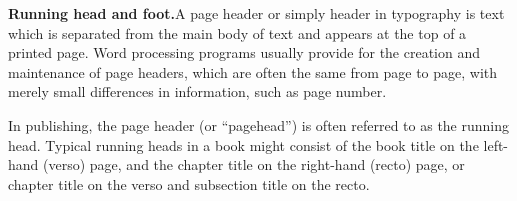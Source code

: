 \begin{multicols}{2}
\textbf{Running head and foot.}\quad A page header or simply header in typography is text which is separated from the main body of text and appears at the top of a printed page. Word processing programs usually provide for the creation and maintenance of page headers, which are often the same from page to page, with merely small differences in information, such as page number.

In publishing, the page header (or ``pagehead'') is often referred to as the running head. Typical running heads in a book might consist of the book title on the left-hand (verso) page, and the chapter title on the right-hand (recto) page, or chapter title on the verso and subsection title on the recto.
\end{multicols}



\begin{teX}
\if@twoside
  \def\ps@headings{%
      \let\@oddfoot\@empty\let\@evenfoot\@empty
      \def\@evenhead{\thepage\hfil\slshape\leftmark}%
      \def\@oddhead{{\slshape\rightmark}\hfil\thepage}%
      \let\@mkboth\markboth
  \def\chaptermark##1{%
      \markboth {\MakeUppercase{%
        \ifnum \c@secnumdepth >\m@ne
          \if@mainmatter
            \@chapapp\ \thechapter. \ %
          \fi
        \fi
        ##1}}{}}%
    \def\sectionmark##1{%
      \markright {\MakeUppercase{%
        \ifnum \c@secnumdepth >\z@
          \thesection. \ %
        \fi
        ##1}}}}
\else
  \def\ps@headings{%
    \let\@oddfoot\@empty
    \def\@oddhead{{\slshape\rightmark}\hfil\thepage}%
    \let\@mkboth\markboth
    \def\chaptermark##1{%
      \markright {\MakeUppercase{%
        \ifnum \c@secnumdepth >\m@ne
          \if@mainmatter
            \@chapapp\ \thechapter. \ %
          \fi
        \fi
        ##1}}}}
\fi
\def\ps@myheadings{%
    \let\@oddfoot\@empty\let\@evenfoot\@empty
    \def\@evenhead{\thepage\hfil\slshape\leftmark}%
    \def\@oddhead{{\slshape\rightmark}\hfil\thepage}%
    \let\@mkboth\@gobbletwo
    \let\chaptermark\@gobble
    \let\sectionmark\@gobble
    }
\end{teX}

